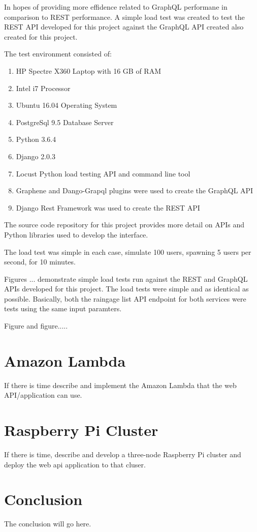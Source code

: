 In hopes of providing more effidence related to GraphQL performane in 
comparison to REST performance.  A simple load test was created to test 
the REST API developed for this project against the GraphQL API created also 
created for this project.

The test environment consisted of:
\begin{enumerate}
\item HP Spectre X360 Laptop with 16 GB of RAM
\item Intel i7 Processor
\item Ubuntu 16.04 Operating System
\item PostgreSql 9.5 Database Server
\item Python 3.6.4
\item Django 2.0.3
\item Locust Python load testing API and command line tool
\item Graphene and Dango-Grapql plugins were used to create the GraphQL API
\item Django Rest Framework was used to create the REST API
\end{enumerate}
The source code repository for this project provides more detail on APIs and 
Python libraries used to develop the interface.

The load test was simple in each case, simulate 100 users, spawning 5 users 
per second, for 10 minutes.

Figures ... demonstrate simple load tests run against the REST and GraphQL APIs 
developed for this project.  The load tests were simple and as identical as 
possible.  Basically, both the raingage list API endpoint for both services 
were tests using the same input paramters.

Figure and figure.....

\section{Amazon Lambda}
If there is time describe and implement the Amazon Lambda that the web 
API/application can use.

\section{Raspberry Pi Cluster}
If there is time, describe and develop a three-node Raspberry Pi cluster and 
deploy the web api application to that cluser.

\section{Conclusion}
The conclusion will go here.


